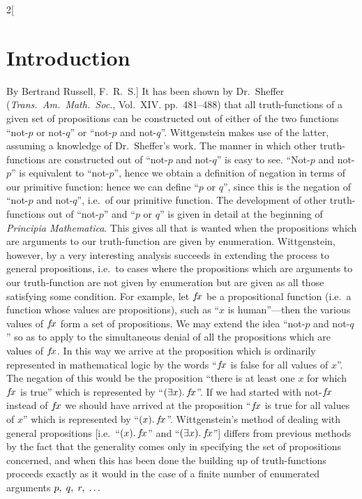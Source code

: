 \documentclass[oneside,openany,12pt]{book}
\newcommand{\ralld}[1]{\mathop{(#1)\mathord{.}}}
\newcommand{\rsomed}[1]{\mathop{(\mathord{\exists} #1)\mathord{.}}}
\begin{document}
\begin{multicols}{2}[\section*{Introduction}By Bertrand Russell, F.\ R.\ S.]
It has been shown by Dr.\ Sheffer (\emph{Trans.\ Am.\ Math.\ Soc.}, Vol.\ XIV. pp.\ 481--488) that all truth-functions of a given set of propositions can be constructed out of either of the two functions ``not-$p$ or not-$q$'' or ``not-$p$ and not-$q$''. Wittgenstein makes use of the latter, assuming a knowledge of Dr.\ Sheffer's work. The manner in which other truth-functions are constructed out of ``not-$p$ and not-$q$'' is easy to see. ``Not-$p$ and not-$p$'' is equivalent to ``not-$p$'', hence we obtain a definition of negation in terms of our primitive function: hence we can define ``$p$ or $q$'', since this is the negation of ``not-$p$ and not-$q$'', i.e.\ of our primitive function. The development of other truth-functions out of ``not-$p$'' and ``$p$ or $q$'' is given in detail at the beginning of \emph{Principia Mathematica}. This gives all that is wanted when the propositions which are arguments to our truth-function are given by enumeration. Wittgenstein, however, by a very interesting analysis succeeds in extending the process to general propositions, i.e.\ to cases where the propositions which are arguments to our truth-function are not given by enumeration but are given as all those satisfying some condition. For example, let $f\negthinspace x$ be a propositional function (i.e.\ a function whose values are propositions), such as ``$x$ is human''---then the various values of $f\negthinspace x$ form a set of propositions. We may extend the idea ``not-$p$ and not-$q$'' so as to apply to the simultaneous denial of all the propositions which are values of $f\negthinspace x$. In this way we arrive at the proposition which is ordinarily represented in mathematical logic by the words ``$f\negthinspace x$ is false for all values of $x$''. The negation of this would be the proposition ``there is at least one $x$ for which $f\negthinspace x$ is true'' which is represented by ``$\rsomed{x} f\negthinspace x$''. If we had started with not-$f\negthinspace x$ instead of $f\negthinspace x$ we should have arrived at the proposition ``$f\negthinspace x$ is true for all values of $x$'' which is represented by ``$\ralld{x} f\negthinspace x$''. Wittgenstein's method of dealing with general propositions [i.e.\ ``$\ralld{x} f\negthinspace x$'' and ``$\rsomed{x} f\negthinspace x$''] differs from previous methods by the fact that the generality comes only in specifying the set of propositions concerned, and when this has been done the building up of truth-functions proceeds exactly as it would in the case of a finite number of enumerated arguments $p,\thickspace q,\thickspace r,\thickspace \ldots$


\end{multicols}
\end{document}
